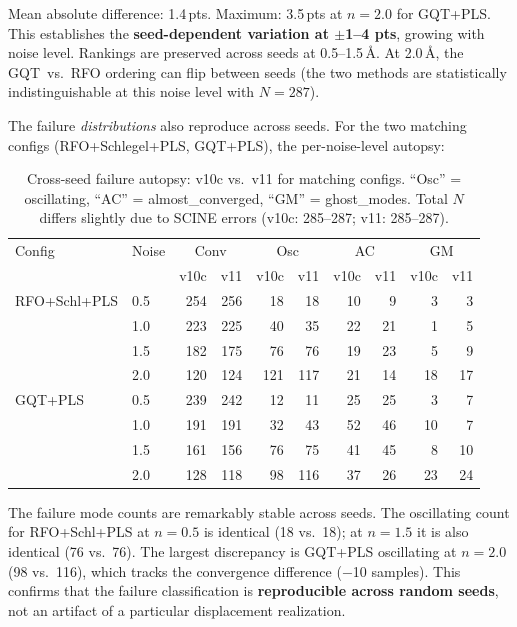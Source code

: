 \documentclass[11pt,a4paper]{article}
\theoremstyle{definition}
\begin{document}
Mean absolute difference: 1.4\,pts.  Maximum: 3.5\,pts at $n=2.0$ for GQT+PLS.
This establishes the \textbf{seed-dependent variation at $\pm$1--4 pts},
growing with noise level.  Rankings are preserved across seeds at 0.5--1.5\,\AA.
At 2.0\,\AA, the GQT~vs.~RFO ordering can flip between seeds (the two methods
are statistically indistinguishable at this noise level with $N=287$).

The failure \emph{distributions} also reproduce across seeds.  For the two
matching configs (RFO+Schlegel+PLS, GQT+PLS), the per-noise-level autopsy:

\begin{table}[h]
\centering
\caption{Cross-seed failure autopsy: v10c vs.\ v11 for matching configs.
  ``Osc'' = oscillating, ``AC'' = almost\_converged, ``GM'' = ghost\_modes.
  Total $N$ differs slightly due to SCINE errors (v10c: 285--287; v11: 285--287).}
\label{tab:autopsy-cross-seed}
\begin{tabular}{llrrrrrrrr}
\toprule
Config & Noise & \multicolumn{2}{c}{Conv} & \multicolumn{2}{c}{Osc} & \multicolumn{2}{c}{AC} & \multicolumn{2}{c}{GM} \\
       &       & v10c & v11 & v10c & v11 & v10c & v11 & v10c & v11 \\
\midrule
RFO+Schl+PLS & 0.5 & 254 & 256 & 18 & 18 & 10 & 9 & 3 & 3 \\
              & 1.0 & 223 & 225 & 40 & 35 & 22 & 21 & 1 & 5 \\
              & 1.5 & 182 & 175 & 76 & 76 & 19 & 23 & 5 & 9 \\
              & 2.0 & 120 & 124 & 121 & 117 & 21 & 14 & 18 & 17 \\
\midrule
GQT+PLS      & 0.5 & 239 & 242 & 12 & 11 & 25 & 25 & 3 & 7 \\
              & 1.0 & 191 & 191 & 32 & 43 & 52 & 46 & 10 & 7 \\
              & 1.5 & 161 & 156 & 76 & 75 & 41 & 45 & 8 & 10 \\
              & 2.0 & 128 & 118 & 98 & 116 & 37 & 26 & 23 & 24 \\
\bottomrule
\end{tabular}
\end{table}

The failure mode counts are remarkably stable across seeds.  The oscillating
count for RFO+Schl+PLS at $n=0.5$ is identical (18 vs.\ 18); at $n=1.5$
it is also identical (76 vs.\ 76).  The largest discrepancy is GQT+PLS
oscillating at $n=2.0$ (98 vs.\ 116), which tracks the convergence
difference ($-$10 samples).  This confirms that the failure classification
is \textbf{reproducible across random seeds}, not an artifact of a
particular displacement realization.
\end{document}
